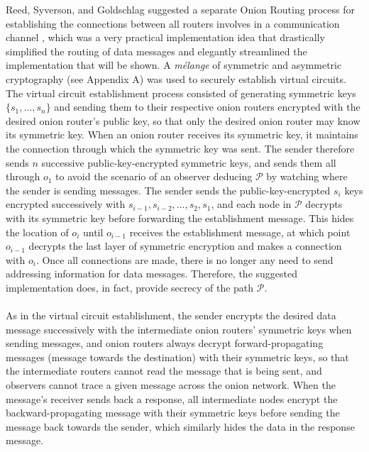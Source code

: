\documentclass[10pt]{report}
\begin{document}
Reed, Syverson, and Goldschlag
suggested a separate Onion Routing process for establishing the connections between all routers
involves in a communication channel \cite{OnionRoutingPatent,HidingRoutingInformation}, which was a
very practical implementation idea that drastically simplified the routing of data messages and
elegantly streamlined the implementation that will be shown. A \textit{m\'elange} of symmetric and
asymmetric cryptography (see Appendix A) was used to securely establish virtual circuits. The
virtual circuit establishment process consisted of generating symmetric keys $\{s_1,\dots,s_n\}$ and
sending them to their respective onion routers encrypted with the desired onion router's public key,
so that only the desired onion router may know its symmetric key. When an onion router receives its
symmetric key, it maintains the connection through which the symmetric key was sent. The sender
therefore sends $n$ successive public-key-encrypted symmetric keys, and sends them all through
$o_1$ to avoid the scenario of an observer deducing $\mathcal{P}$ by watching where the sender is
sending messages. The sender sends the public-key-encrypted $s_i$ keys encrypted successively with
$s_{i-1},s_{i-2},\dots,s_2,s_1$, and each node in $\mathcal{P}$ decrypts with its symmetric key
before forwarding the establishment message. This hides the location of $o_i$ until $o_{i-1}$
receives the establishment message, at which point $o_{i-1}$ decrypts the last layer of symmetric
encryption and makes a connection with $o_i$. Once all connections are made, there is no longer any
need to send addressing information for data messages. Therefore, the suggested implementation does,
in fact, provide secrecy of the path $\mathcal{P}$.\\\\
As in the virtual circuit establishment, the sender encrypts the desired data message successively
with the intermediate onion routers' symmetric keys when sending messages, and onion routers always
decrypt forward-propagating messages (message towards the destination) with their symmetric keys, so
that the intermediate routers cannot read the message that is being sent, and observers cannot trace
a given message across the onion network. When the message's receiver sends back a response, all
intermediate nodes encrypt the backward-propagating message with their symmetric keys before sending
the message back towards the sender, which similarly hides the data in the response message.\\
\end{document}

